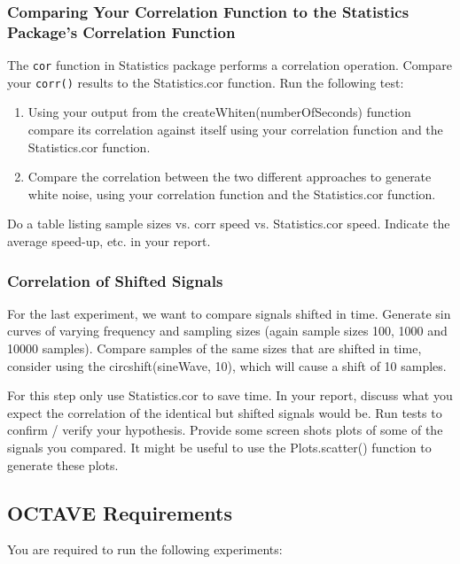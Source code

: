 \subsubsection{Comparing Your Correlation Function to the Statistics Package's Correlation Function}
The \verb|cor| function in Statistics package performs a correlation operation. Compare your \verb|corr()| results to the Statistics.cor function. Run the following test:

\begin{enumerate}
    \item Using your output from the createWhiten(numberOfSeconds) function compare its correlation against itself using your correlation function and the Statistics.cor function.
    \item Compare the correlation between the two different approaches to generate white noise, using your correlation function and the Statistics.cor function.
\end{enumerate}


Do a table listing sample sizes vs. corr speed vs. Statistics.cor speed. Indicate the average speed-up, etc. in your report.

\subsubsection{Correlation of Shifted Signals}
For the last experiment, we want to compare signals shifted in time. Generate sin curves of varying frequency and sampling sizes (again sample sizes 100, 1000 and 10000 samples). Compare samples of the same sizes that are shifted in time, consider using the circshift(sineWave, 10), which will cause a shift of 10 samples.

For this step only use Statistics.cor to save time. In your report, discuss what you expect the correlation of the identical but shifted signals would be. Run tests to confirm / verify your hypothesis. Provide some screen shots plots of some of the signals you compared. It might be useful to use the Plots.scatter() function to generate these plots.


\subsection{OCTAVE Requirements}
You are required to run the following experiments:

